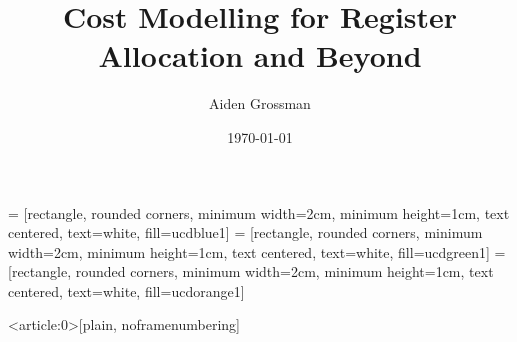 \documentclass[light]{ucdbeamer}
\institute[UC Davis]{University of California, Davis}
\author{Aiden Grossman}
\title{Cost Modelling for Register Allocation and Beyond}
\date{\today}
\begin{document}

 = [rectangle, rounded corners, minimum width=2cm, minimum height=1cm, text centered, text=white, fill=ucdblue1]
 = [rectangle, rounded corners, minimum width=2cm, minimum height=1cm, text centered, text=white, fill=ucdgreen1]
 = [rectangle, rounded corners, minimum width=2cm, minimum height=1cm, text centered, text=white, fill=ucdorange1]

{
  \begin{frame}<article:0>[plain, noframenumbering]
  \end{frame}
}
    
{ %
}
\end{document}
